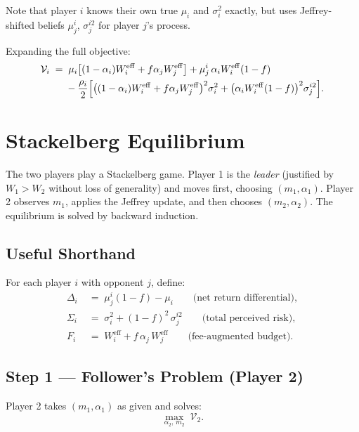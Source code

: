 \documentclass[12pt,a4paper]{article}
\newcommand{\1}{\mathbf{1}}
\begin{document}
Note that player $i$ knows their own true $\mu_i$ and $\sigma_i^2$ exactly, but uses Jeffrey-shifted beliefs $\mu_j^i$, $\sigma_j^{i2}$ for player $j$'s process.

Expanding the full objective:
\begin{align}
  \mathcal{V}_i \;=\;&\; \mu_i\bigl[(1-\alpha_i)W_i^{\mathrm{eff}} + f\alpha_j W_j^{\mathrm{eff}}\bigr]
  + \mu_j^i\,\alpha_i W_i^{\mathrm{eff}}(1-f) \notag\\
  &- \frac{\rho_i}{2}\Bigl[
    \bigl((1-\alpha_i)W_i^{\mathrm{eff}} + f\alpha_j W_j^{\mathrm{eff}}\bigr)^2\sigma_i^2
    + \bigl(\alpha_i W_i^{\mathrm{eff}}(1-f)\bigr)^2\sigma_j^{i2}
  \Bigr]. \label{eq:full_obj}
\end{align}

\section{Stackelberg Equilibrium}

The two players play a Stackelberg game. Player 1 is the \emph{leader} (justified by $W_1 > W_2$ without loss of generality) and moves first, choosing $(m_1, \alpha_1)$. Player 2 observes $m_1$, applies the Jeffrey update, and then chooses $(m_2, \alpha_2)$. The equilibrium is solved by backward induction.

\subsection{Useful Shorthand}

For each player $i$ with opponent $j$, define:
\begin{align}
  \Delta_i &\;=\; \mu_j^i(1-f) - \mu_i \qquad \text{(net return differential)}, \label{eq:Delta}\\
  \Sigma_i &\;=\; \sigma_i^2 + (1-f)^2\,\sigma_j^{i2} \qquad \text{(total perceived risk)}, \label{eq:Sigma}\\
  F_i &\;=\; W_i^{\mathrm{eff}} + f\,\alpha_j\, W_j^{\mathrm{eff}} \qquad \text{(fee-augmented budget)}. \label{eq:F}
\end{align}

\subsection{Step 1 — Follower's Problem (Player 2)}

Player 2 takes $(m_1, \alpha_1)$ as given and solves:
\[
  \max_{\alpha_2,\, m_2} \;\mathcal{V}_2.
\]
\end{document}
